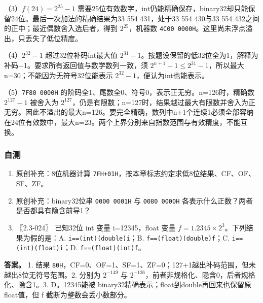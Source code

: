 （3）\(f(24)=2^{25}-1\) 需要25位有效数字，int仍能精确保存，binary32却只能保留24位。最后一次加法的精确结果为33 554 431，处于33 554 430与33 554 432之间的正中；最近偶数舍入选后者，得到 \(2^{25}\)，机器数 \texttt{4C00\ 0000H}。这里尚未浮点溢出，只丢失了低位精度。

（4）\(2^{32}-1\) 超过32位补码int最大值 \(2^{31}-1\)。按题设保留的低32位全为1，解释为补码−1。要求所有返回值与数学数列一致，须 \(2^{n+1}-1\le2^{31}-1\)，所以最大n=30；不能因为无符号32位能表示 \(2^{32}-1\)，便认为int也能表示。

（5）\texttt{7F80\ 0000H} 的阶码全1、尾数全0、符号0，表示正无穷。n=126时，精确数 \(2^{127}-1\) 被舍入为 \(2^{127}\)，仍是有限数；n=127时，结果越过最大有限数并舍入为正无穷。因此不溢出的最大n=126。要完全精确，数列中n+1个连续1必须全部容纳在24位有效数中，最大n=23。两个上界分别来自指数范围与有效精度，不能互换。

\subsubsection{自测}\label{co-self2}

\begin{enumerate}
\def\labelenumi{\arabic{enumi}.}
\tightlist
\item
  原创补充：8位机器计算 \texttt{7FH+01H}，按本章标志约定求低8位结果、CF、OF、SF、ZF。
\item
  原创补充：binary32位串 \texttt{0000\ 0001H} 与 \texttt{0080\ 0000H} 各表示什么正数？两者是否都具有隐含前导1？
\item
  〖2.3-024〗 已知32位 int 变量 i=12345，float 变量 \(f=1.2345\times2^3\)。下列结果为假的是：A. \texttt{i==(int)(double)i}；B. \texttt{f==(float)(double)f}；C. \texttt{i==(int)(float)i}；D. \texttt{f==(float)(int)f}。
\end{enumerate}

\textbf{答案。} 1. 结果 \texttt{80H}，CF=0、OF=1、SF=1、ZF=0；127+1越出补码范围，但未越出8位无符号范围。2. 分别为 \(2^{-149}\) 与 \(2^{-126}\)，前者非规格化、隐含0，后者规格化、隐含1。3. D。12345能被 binary32精确表示；float到double再回来也保留原float值，但 f 截断为整数会丢小数部分。
